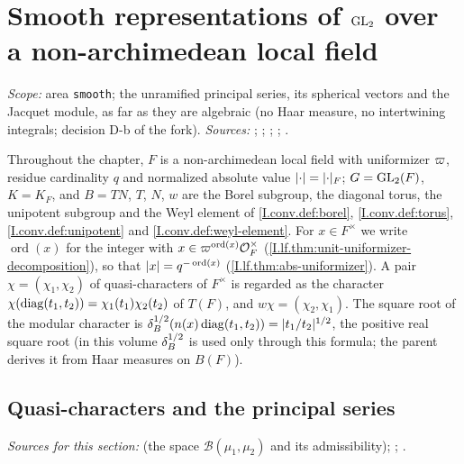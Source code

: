 
\chapter{\texorpdfstring{Smooth representations of $\mathrm{GL}_2$ over a non-archimedean local field}{Smooth representations of GL₂ over a non-archimedean local field}}\label{ch:ch-1-02-smooth}

\noindent\emph{Scope:} area \texttt{smooth}; the unramified principal series, its spherical vectors and the Jacquet module, as far
as they are algebraic (no Haar measure, no intertwining integrals; decision D-b of the fork). \emph{Sources:} \cite[§§2--4]{JL};
\cite[§§3--7, §9]{Cas-p}; \cite{Bern}; \cite{BZ}; \cite{A-SC}.

Throughout the chapter, $F$ is a non-archimedean local field with uniformizer $\varpi$, residue cardinality $q$ and
normalized absolute value $\lvert\cdot\rvert=\lvert\cdot\rvert_F$; $G=\mathrm{GL}_2(F)$, $K=K_F$, and $B=TN$, $T$, $N$, $w$ are the Borel
subgroup, the diagonal torus, the unipotent subgroup and the Weyl element of \cref{I.conv.def:borel},
\cref{I.conv.def:torus}, \cref{I.conv.def:unipotent} and \cref{I.conv.def:weyl-element}. For $x\in F^\times$ we write
$\operatorname{ord}(x)$ for the integer with $x\in\varpi^{\operatorname{ord}(x)}\mathcal{O}_F^\times$
(\cref{I.lf.thm:unit-uniformizer-decomposition}), so that $\lvert x\rvert=q^{-\operatorname{ord}(x)}$
(\cref{I.lf.thm:abs-uniformizer}). A pair $\chi=(\chi_1,\chi_2)$ of quasi-characters of $F^\times$ is regarded as the
character $\chi(\operatorname{diag}(t_1,t_2))=\chi_1(t_1)\chi_2(t_2)$ of $T(F)$, and $w\chi=(\chi_2,\chi_1)$. The square root of the
modular character is $\delta_B^{1/2}(n(x)\operatorname{diag}(t_1,t_2))=\lvert t_1/t_2\rvert^{1/2}$, the positive real square root
(in this volume $\delta_B^{1/2}$ is used only through this formula; the parent derives it from Haar measures on $B(F)$).

\section{Quasi-characters and the principal series}\label{sec:smooth-principal-series}

{\sloppy\noindent\emph{Sources for this section:} \cite[§3, (3.1), p.~46]{JL} (the space $\mathcal B(\mu_1,\mu_2)$
and its admissibility); \cite[§3.1, normalized induction and Proposition~3.1.1, p.~32]{Cas-p}; \cite[§1.6, unramified
characters, p.~17]{Cas-p}.\par}

